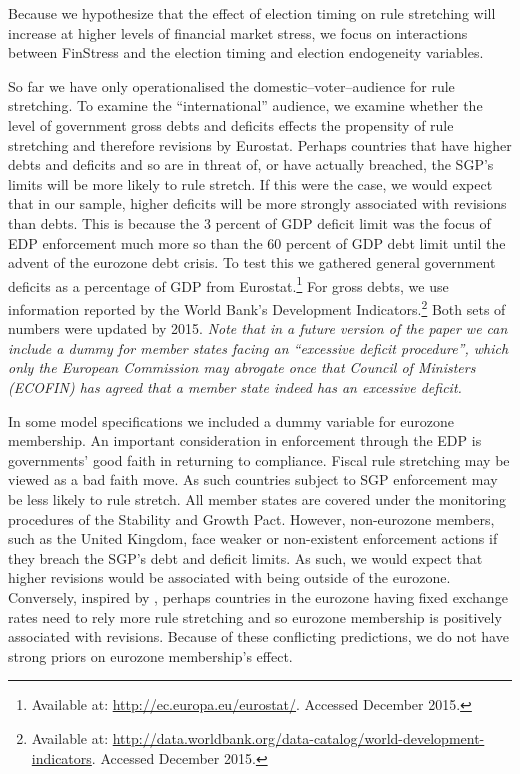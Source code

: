 \documentclass[]{article}
\begin{document}
Because we hypothesize that the effect of election timing on rule stretching will increase at higher levels of financial market stress, we focus on interactions between FinStress and the election timing and election endogeneity variables.

So far we have only operationalised the domestic--voter--audience for rule stretching. To examine the ``international'' audience, we examine whether the level of government gross debts and deficits effects the propensity of rule stretching and therefore revisions by Eurostat. Perhaps countries that have higher debts and deficits and so are in threat of, or have actually breached, the SGP's limits will be more likely to rule stretch. If this were the case, we would expect that in our sample, higher deficits will be more strongly associated with revisions than debts. This is because the 3 percent of GDP deficit limit was the focus of EDP enforcement much more so than the 60 percent of GDP debt limit until the advent of the eurozone debt crisis. To test this we gathered general government deficits as a percentage of GDP from Eurostat.\footnote{Available at: \url{http://ec.europa.eu/eurostat/}. Accessed December 2015.} For gross debts, we use information reported by the World Bank's Development Indicators.\footnote{Available at: \url{http://data.worldbank.org/data-catalog/world-development-indicators}. Accessed December 2015.} Both sets of numbers were updated by 2015. \emph{Note that in a future version of the paper we can include a dummy for member states facing an ``excessive deficit procedure'', which only the European Commission may abrogate once that Council of Ministers (ECOFIN) has agreed that a member state indeed has an excessive deficit.}

In some model specifications we included a dummy variable for eurozone membership. An important consideration in enforcement through the EDP is governments' good faith in returning to compliance. Fiscal rule stretching may be viewed as a bad faith move. As such countries subject to SGP enforcement may be less likely to rule stretch. All member states are covered under the monitoring procedures of the Stability and Growth Pact. However, non-eurozone members, such as the United Kingdom, face weaker or non-existent enforcement actions if they breach the SGP's debt and deficit limits. As such, we would expect that higher revisions would be associated with being outside of the eurozone. Conversely, inspired by \cite{clark2003}, perhaps countries in the eurozone having fixed exchange rates need to rely more rule stretching and so eurozone membership is positively associated with revisions. Because of these conflicting predictions, we do not have strong priors on eurozone membership's effect.
\end{document}
